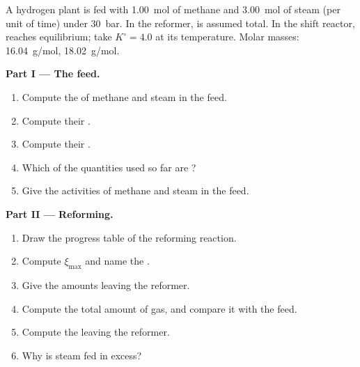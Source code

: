 \begin{problem}
\label{pb:b1:extent-q-and-k:1}
A hydrogen plant is fed with \qty{1.00}{mol} of methane and
\qty{3.00}{mol} of steam (per unit of time) under \qty{30}{bar}. In the
reformer,  is assumed total. In the shift
reactor,  reaches equilibrium; take $K^\circ =
4.0$ at its temperature. Molar masses:  \qty{16.04}{g/mol},
 \qty{18.02}{g/mol}.

\medskip
\noindent\textbf{Part I --- The feed.}
\begin{enumerate}
  \item Compute the  of methane and steam in the feed.
  \item Compute their .
  \item Compute their .
  \item Which of the quantities used so far are ?
  \item Give the activities of methane and steam in the feed.
\end{enumerate}

\medskip
\noindent\textbf{Part II --- Reforming.}
\begin{enumerate}[resume]
  \item Draw the progress table of the reforming reaction.
  \item Compute $\xi_{\max}$ and name the .
  \item Give the amounts leaving the reformer.
  \item Compute the total amount of gas, and compare it with the feed.
  \item Compute the  leaving the reformer.
  \item Why is steam fed in excess?
\end{enumerate}


\end{problem}
